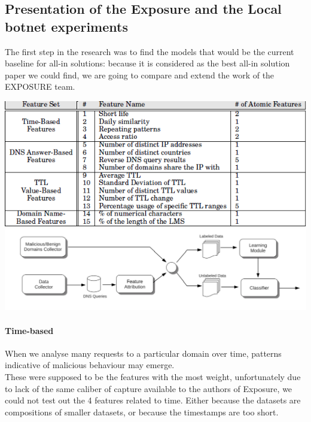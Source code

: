 \subsection{Presentation of the Exposure and the Local botnet experiments}
The first step in the research was to find the models that would be the current baseline for all-in solutions: because it is considered as the best all-in solution paper we could find, we are going to compare and extend the work of the EXPOSURE team.

\includegraphics[scale=.8]{img/exposure_features.png}
\includegraphics[scale=.8]{img/exposure_architecture.png}

\paragraph{Time-based}
When we analyse many requests to a particular domain over time, patterns indicative of malicious behaviour may emerge.\\
These were supposed to be the features with the most weight, unfortunately due to lack of the same caliber of capture available to the authors of Exposure, we could not test out the 4 features related to time. Either because the datasets are compositions of smaller datasets, or because the timestamps are too short.
